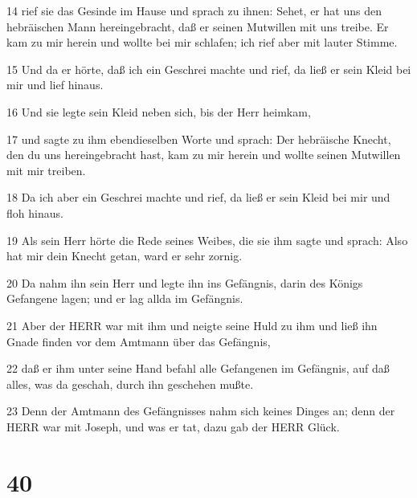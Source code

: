 \par 14 rief sie das Gesinde im Hause und sprach zu ihnen: Sehet, er hat uns den hebräischen Mann hereingebracht, daß er seinen Mutwillen mit uns treibe. Er kam zu mir herein und wollte bei mir schlafen; ich rief aber mit lauter Stimme.
\par 15 Und da er hörte, daß ich ein Geschrei machte und rief, da ließ er sein Kleid bei mir und lief hinaus.
\par 16 Und sie legte sein Kleid neben sich, bis der Herr heimkam,
\par 17 und sagte zu ihm ebendieselben Worte und sprach: Der hebräische Knecht, den du uns hereingebracht hast, kam zu mir herein und wollte seinen Mutwillen mit mir treiben.
\par 18 Da ich aber ein Geschrei machte und rief, da ließ er sein Kleid bei mir und floh hinaus.
\par 19 Als sein Herr hörte die Rede seines Weibes, die sie ihm sagte und sprach: Also hat mir dein Knecht getan, ward er sehr zornig.
\par 20 Da nahm ihn sein Herr und legte ihn ins Gefängnis, darin des Königs Gefangene lagen; und er lag allda im Gefängnis.
\par 21 Aber der HERR war mit ihm und neigte seine Huld zu ihm und ließ ihn Gnade finden vor dem Amtmann über das Gefängnis,
\par 22 daß er ihm unter seine Hand befahl alle Gefangenen im Gefängnis, auf daß alles, was da geschah, durch ihn geschehen mußte.
\par 23 Denn der Amtmann des Gefängnisses nahm sich keines Dinges an; denn der HERR war mit Joseph, und was er tat, dazu gab der HERR Glück.

\chapter{40}

